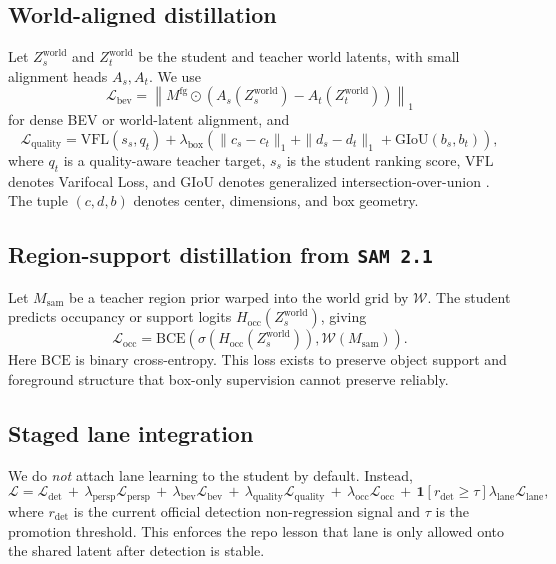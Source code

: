\documentclass[11pt]{article}
\newcommand{\loss}{\mathcal{L}}
\begin{document}
\subsection{World-aligned distillation}
Let \(Z_s^{\text{world}}\) and \(Z_t^{\text{world}}\) be the student and teacher world latents,
with small alignment heads \(A_s, A_t\). We use
\begin{equation}
\loss_{\text{bev}}
=
\left\|
M^{\text{fg}} \odot \left(A_s(Z_s^{\text{world}})-A_t(Z_t^{\text{world}})\right)
\right\|_1
\end{equation}
for dense BEV or world-latent alignment, and
\begin{equation}
\loss_{\text{quality}}
=
\mathrm{VFL}(s_s, q_t)
+ \lambda_{\text{box}}
\left(
\|c_s-c_t\|_1 + \|d_s-d_t\|_1 + \mathrm{GIoU}(b_s,b_t)
\right),
\label{eq:quality}
\end{equation}
where \(q_t\) is a quality-aware teacher target, \(s_s\) is the student ranking score,
\(\mathrm{VFL}\) denotes Varifocal Loss, and \(\mathrm{GIoU}\) denotes generalized
intersection-over-union \cite{varifocalnet,giou}. The tuple \((c,d,b)\) denotes center, dimensions,
and box geometry.

\subsection{Region-support distillation from \texttt{SAM 2.1}}
Let \(M_{\text{sam}}\) be a teacher region prior warped into the world grid by \(\mathcal{W}\). The
student predicts occupancy or support logits \(H_{\text{occ}}(Z_s^{\text{world}})\), giving
\begin{equation}
\loss_{\text{occ}}
=
\mathrm{BCE}\!\left(
\sigma\!\left(H_{\text{occ}}(Z_s^{\text{world}})\right),
\mathcal{W}(M_{\text{sam}})
\right).
\label{eq:occ}
\end{equation}
Here \(\mathrm{BCE}\) is binary cross-entropy. This loss exists to preserve object support and foreground structure that box-only supervision
cannot preserve reliably.

\subsection{Staged lane integration}
We do \emph{not} attach lane learning to the student by default. Instead,
\begin{equation}
\loss
=
\loss_{\text{det}}
\,+\,\lambda_{\text{persp}}\loss_{\text{persp}}
\,+\,\lambda_{\text{bev}}\loss_{\text{bev}}
\,+\,\lambda_{\text{quality}}\loss_{\text{quality}}
\,+\,\lambda_{\text{occ}}\loss_{\text{occ}}
\,+\,\mathbf{1}[r_{\text{det}}\ge\tau]\lambda_{\text{lane}}\loss_{\text{lane}},
\label{eq:stage}
\end{equation}
where \(r_{\text{det}}\) is the current official detection non-regression signal and \(\tau\) is the
promotion threshold. This enforces the repo lesson that lane is only allowed onto the shared latent
after detection is stable.
\end{document}
